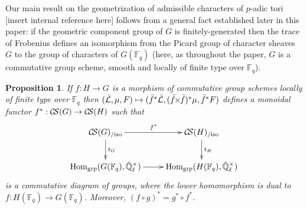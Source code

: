 \documentclass[11pt]{amsart}
\theoremstyle{plain}
\newtheorem{proposition}[theorem]{Proposition}
\theoremstyle{definition}
\theoremstyle{remark}
\newcommand{\EE}{\mathbb{\bar Q}_\ell}
\newcommand{\Fq}{{\mathbb{F}_q}}
\DeclareMathOperator{\Hom}{Hom}
\newcommand{\gcs}[1]{{\mathcal{\bar #1}}}
\newcommand{\CS}{{\mathcal{C\hskip-1.8pt S}}}
\newcommand{\tightertimes}{\hskip-3pt\times\hskip-3pt}
\begin{document}
Our main result on the geometrization of admissible characters of $p$-adic tori [insert internal reference here] follows from a general fact established later in this paper: if the geometric component group of $G$ is finitely-generated then the trace of Frobenius defines an isomorphism from the Picard group of character sheaves $G$ to the group of characters of $G(\Fq)$ (here, as throughout the paper, $G$ is a commutative group scheme, smooth and locally of finite type over $\Fq$).


\begin{proposition}\label{prop:pullback}
If $f : H\to G$ is a morphism of commutative group schemes locally of finite type over $\Fq$ then $(\gcs{L},\mu,F) \mapsto ({\bar f}^*\gcs{L},({\bar f}\tightertimes{\bar f})^*\mu,{\bar f}^*F)$ defines a monoidal functor $f^* : \CS(G) \to \CS(H)$ such that
\[
\xymatrix{
\CS(G)_{/\text{iso}} \ar[r]^{f^*} \ar[d]^{t_{G}} &  \ar[d]^{t_{H}} \CS(H)_{/\text{iso}}\\
\Hom_\text{grp}(G(\Fq),\EE^\times) \ar[r] & \Hom_\text{grp}(H(\Fq),\EE^\times)
}
\]
is a commutative diagram of groups, where the lower homomorphism is dual to $f : H(\Fq)\to G(\Fq)$.  Moreover, $(f\circ g)^* = g^* \circ f^*$.
\end{proposition}
\end{document}

